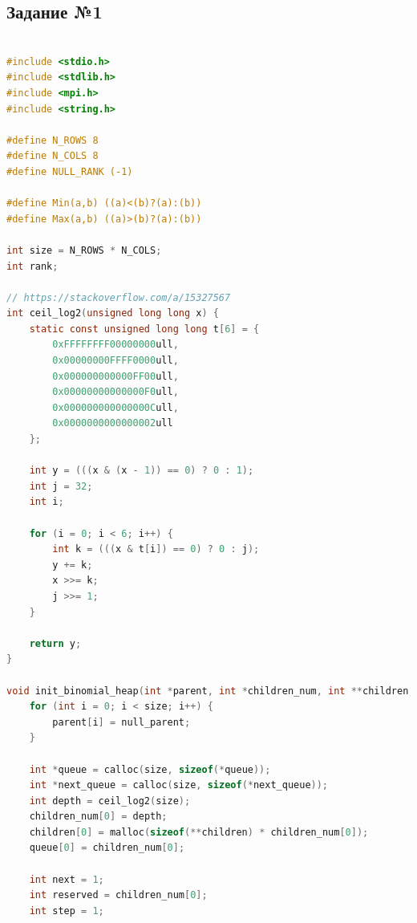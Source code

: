 \documentclass[a4paper]{article}
\begin{document}
\lstset{style=mystyle}

\subsection{Задание №1}

\begin{lstlisting}[caption=transputer\_matrix.c, label={lst:1}, language=C]

#include <stdio.h>
#include <stdlib.h>
#include <mpi.h>
#include <string.h>

#define N_ROWS 8
#define N_COLS 8
#define NULL_RANK (-1)

#define Min(a,b) ((a)<(b)?(a):(b))
#define Max(a,b) ((a)>(b)?(a):(b))

int size = N_ROWS * N_COLS;
int rank;

// https://stackoverflow.com/a/15327567
int ceil_log2(unsigned long long x) {
    static const unsigned long long t[6] = {
        0xFFFFFFFF00000000ull,
        0x00000000FFFF0000ull,
        0x000000000000FF00ull,
        0x00000000000000F0ull,
        0x000000000000000Cull,
        0x0000000000000002ull
    };

    int y = (((x & (x - 1)) == 0) ? 0 : 1);
    int j = 32;
    int i;

    for (i = 0; i < 6; i++) {
        int k = (((x & t[i]) == 0) ? 0 : j);
        y += k;
        x >>= k;
        j >>= 1;
    }

    return y;
}

void init_binomial_heap(int *parent, int *children_num, int **children, int null_parent) {
    for (int i = 0; i < size; i++) {
        parent[i] = null_parent;
    }

    int *queue = calloc(size, sizeof(*queue));
    int *next_queue = calloc(size, sizeof(*next_queue));
    int depth = ceil_log2(size);
    children_num[0] = depth;
    children[0] = malloc(sizeof(**children) * children_num[0]);
    queue[0] = children_num[0];

    int next = 1;
    int reserved = children_num[0];
    int step = 1;


\end{lstlisting}
\end{document}
